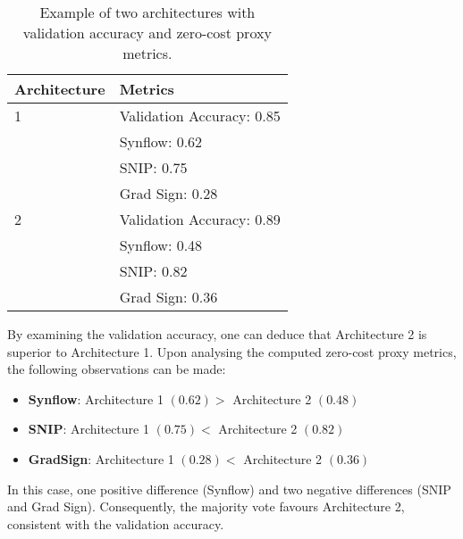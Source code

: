 \begin{table}[h]
\centering
\caption{Example of two architectures with validation accuracy and zero-cost proxy metrics.}
\begin{tabular}{ll}
\textbf{Architecture} & \textbf{Metrics}          \\ \hline
\multicolumn{1}{l|}{1} & \multicolumn{1}{l}{Validation Accuracy: 0.85} \\
\multicolumn{1}{l|}{\cellcolor{verylightgray}} & \cellcolor{verylightgray}Synflow: 0.62 \\
\multicolumn{1}{l|}{} & \multicolumn{1}{l}{SNIP: 0.75} \\
\multicolumn{1}{l|}{\cellcolor{verylightgray}} & \cellcolor{verylightgray}Grad Sign: 0.28 \\ \hline
\multicolumn{1}{l|}{2} & \multicolumn{1}{l}{Validation Accuracy: 0.89} \\
\multicolumn{1}{l|}{\cellcolor{verylightgray}} & \cellcolor{verylightgray}Synflow: 0.48 \\
\multicolumn{1}{l|}{} & \multicolumn{1}{l}{SNIP: 0.82} \\
\multicolumn{1}{l|}{\cellcolor{verylightgray}} & \cellcolor{verylightgray}Grad Sign: 0.36
\end{tabular}
\label{tab:example_architectures}
\end{table}

By examining the validation accuracy, one can deduce that Architecture 2 is superior to Architecture 1. Upon analysing the computed zero-cost proxy metrics, the following observations can be made:

\begin{itemize}
\item \textbf{Synflow}: Architecture 1 $(0.62) >$ Architecture 2 $(0.48)$
\item \textbf{SNIP}: Architecture 1 $(0.75) <$ Architecture 2 $(0.82)$
\item \textbf{GradSign}: Architecture 1 $(0.28) <$ Architecture 2 $(0.36)$
\end{itemize}

In this case, one positive difference (\gls{Synflow}) and two negative differences (\gls{SNIP} and Grad Sign). Consequently, the majority vote favours Architecture 2, consistent with the validation accuracy.